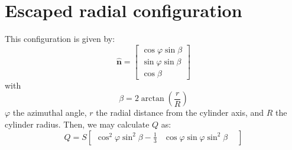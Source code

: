 \documentclass[reqno]{article}
\newcommand{\n}{\mathbf{\hat{n}}}
\begin{document}
\section{Escaped radial configuration}

This configuration is given by:
\begin{equation}
    \n
    =
    \begin{bmatrix}
        \cos \varphi \sin \beta \\
        \sin \varphi \sin \beta \\
        \cos \beta
    \end{bmatrix}
\end{equation}
with
\begin{equation}
    \beta
    =
    2\arctan \left( \frac{r}{R} \right)
\end{equation}
$\varphi$ the azimuthal angle, $r$ the radial distance from the cylinder axis, and $R$ the cylinder radius.
Then, we may calculate $Q$ as:
\begin{equation}
    Q
    =
    S
    \begin{bmatrix}
        \cos^2 \varphi \sin^2 \beta - \tfrac13 &\cos\varphi \sin \varphi \sin^2 \beta &
    \end{bmatrix}
\end{equation}
\end{document}
